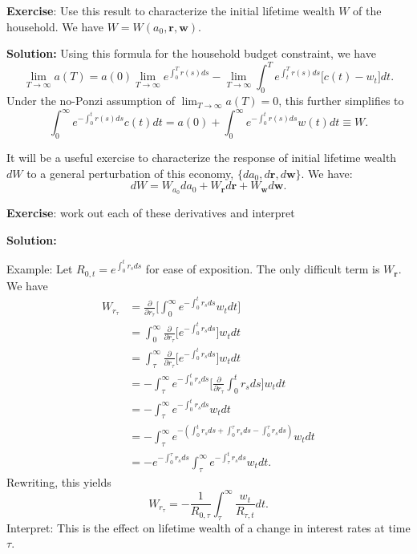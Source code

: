 \documentclass[11pt]{extarticle}
\theoremstyle{plain}
\theoremstyle{definition}
\begin{document}
\textbf{Exercise}: Use this result to characterize the initial lifetime wealth $W$ of the household. We have $W = W(a_0, \bm{r}, \bm{w})$. 

\textbf{Solution:} Using this formula for the household budget constraint, we have
	\begin{equation*}
		\lim_{T \to \infty} a(T)  = a(0) \lim_{T \to \infty} e^{\int_0^T r(s) ds} -  \lim_{T \to \infty} \int_0^T e^{\int_t^T r(s) ds } \Big[ c(t) - w_t \Big] dt.
	\end{equation*}
	Under the no-Ponzi assumption of $\lim_{T \to \infty} a(T) = 0$, this further simplifies to 
	\begin{equation*}
		\int_0^\infty e^{- \int_0^t r(s) ds }   c(t) dt = a(0) + \int_0^\infty e^{- \int_0^t r(s) ds }   w(t) dt \equiv W.
	\end{equation*}


\vspace{5mm}
\noindent
It will be a useful exercise to characterize the response of initial lifetime wealth $dW$ to a general perturbation of this economy, $\{da_0, d \bm r, d \bm w\}$. We have:
\begin{equation*}
	dW = W_{a_0} da_0 + W_{\bm r} d \bm{r} + W_{ \bm w} d \bm w. 
\end{equation*}

\textbf{Exercise}: work out each of these derivatives and interpret 

\textbf{Solution:}



Example: Let $R_{0,t} = e^{\int_0^t r_s ds }$ for ease of exposition. The only difficult term is $W_{\bm r}$. We have 
\begin{align*}
	W_{r_\tau} &= \frac{\partial }{\partial r_{\tau}} \bigg[ \int_0^\infty e^{- \int_0^t r_s ds }   w_t dt \bigg] \\
	&= \int_0^\infty \frac{\partial }{\partial r_{\tau}} \bigg[e^{- \int_0^t r_s ds } \bigg] w_t dt  \\
	&= \int_\tau^\infty \frac{\partial }{\partial r_{\tau}} \bigg[e^{- \int_0^t r_s ds } \bigg] w_t dt  \\
	&= - \int_\tau^\infty e^{- \int_0^t r_s ds } \bigg[ \frac{\partial }{\partial r_{\tau}} \int_0^t r_s ds \bigg] w_t dt  \\
	&= - \int_\tau^\infty e^{- \int_0^t r_s ds } w_t dt  \\
	&= - \int_\tau^\infty e^{- (\int_0^t r_s ds + \int_0^\tau r_s ds - \int_0^\tau r_s ds)} w_t dt  \\
	&= - e^{- \int_0^\tau r_s ds } \int_\tau^\infty e^{- \int_\tau^t r_s ds} w_t dt .
\end{align*}
Rewriting, this yields 
\begin{equation*}
	W_{r_\tau} = - \frac{1}{R_{0, \tau}} \int_\tau^\infty \frac{w_t}{R_{\tau, t}} dt.
\end{equation*}
Interpret: This is the effect on lifetime wealth of a change in interest rates at time $\tau$.
\end{document}
